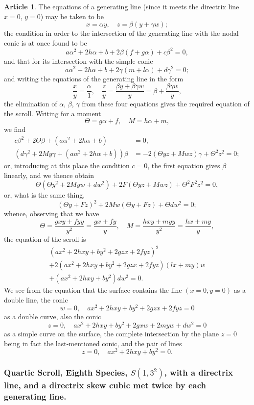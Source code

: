 \documentclass[12pt,a4paper]{article}
\theoremstyle{definition}
\newtheorem{art}{Article}[section]
\begin{document}
\begin{art}
The equations of a generating line (since it meets the directrix line $x = 0$, $y = 0$) may be taken to be
\[
x = \alpha y, \quad z = \beta(y + \gamma w);
\]
the condition in order to the intersection of the generating line with the nodal conic is at once found to be
\[
a\alpha^2 + 2h\alpha + b + 2\beta(f + g\alpha) + c\beta^2 = 0,
\]
and that for its intersection with the simple conic
\[
a\alpha^2 + 2h\alpha + b + 2\gamma(m + l\alpha) + d\gamma^2 = 0;
\]
and writing the equations of the generating line in the form
\[
\frac{x}{y} = \frac{\alpha}{1}, \quad \frac{z}{y} = \frac{\beta y + \beta\gamma w}{y} = \beta + \frac{\beta\gamma w}{y},
\]
the elimination of $\alpha$, $\beta$, $\gamma$ from these four equations gives the required equation of the scroll. Writing for a moment
\[
\Theta = g\alpha + f, \quad M = h\alpha + m,
\]
we find
\begin{align*}
c\beta^2 + 2\Theta\beta + (a\alpha^2 + 2h\alpha + b) &= 0, \\
(d\gamma^2 + 2My\gamma + (a\alpha^2 + 2h\alpha + b))\beta &= -2(\Theta yz + Mwz)\gamma + \Theta^2 z^2 = 0;
\end{align*}
or, introducing at this place the condition $c = 0$, the first equation gives $\beta$ linearly, and we thence obtain
\[
\Theta(\Theta y^2 + 2Myw + dw^2) + 2F(\Theta yz + Mwz) + \Theta^2 F^2 z^2 = 0,
\]
or, what is the same thing,
\[
(\Theta y + Fz)^2 + 2Mw(\Theta y + Fz) + \Theta dw^2 = 0;
\]
whence, observing that we have
\[
\Theta = \frac{gxy + fyy}{y^2} = \frac{gx + fy}{y}, \quad M = \frac{hxy + myy}{y^2} = \frac{hx + my}{y},
\]
the equation of the scroll is
\begin{multline*}
(ax^2 + 2hxy + by^2 + 2gzx + 2fyz)^2 \\
+ 2(ax^2 + 2hxy + by^2 + 2gzx + 2fyz)(lx + my)w \\
+ (ax^2 + 2hxy + by^2)dw^2 = 0.
\end{multline*}
We see from the equation that the surface contains the line $(x = 0, y = 0)$ as a double line, the conic
\[
w = 0, \quad ax^2 + 2hxy + by^2 + 2gzx + 2fyz = 0
\]
as a double curve, also the conic
\[
z = 0, \quad ax^2 + 2hxy + by^2 + 2gxw + 2myw + dw^2 = 0
\]
as a simple curve on the surface, the complete intersection by the plane $z = 0$ being in fact the last-mentioned conic, and the pair of lines
\[
z = 0, \quad ax^2 + 2hxy + by^2 = 0.
\]
\end{art}

\subsubsection*{Quartic Scroll, Eighth Species, $S(1, 3^2)$, with a directrix line, and a directrix skew cubic met twice by each generating line.}
\end{document}
